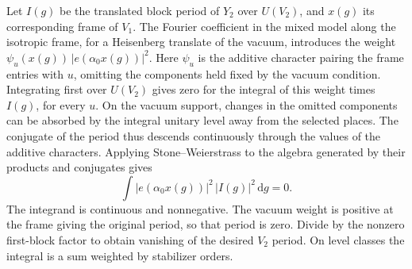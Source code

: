 Let \(I(g)\) be the translated block period of \(Y_2\) over \(U(V_2)\),
and \(x(g)\) its corresponding frame of \(V_1\). The Fourier coefficient
in the mixed model along the isotropic frame, for a Heisenberg translate
of the vacuum, introduces the weight
\(\psi_u(x(g))\,|e(\alpha_0x(g))|^2\).
Here \(\psi_u\) is the additive character pairing the frame entries
with \(u\), omitting the components held fixed by the vacuum condition.
Integrating first over \(U(V_2)\) gives zero for the integral of this weight
times \(I(g)\), for every \(u\). On the vacuum support, changes in the
omitted components can be absorbed by the integral unitary level away
from the selected places. The conjugate of the period thus descends
continuously through the values of the additive characters. Applying
Stone--Weierstrass to the algebra generated by their products and
conjugates gives
\[
 \int |e(\alpha_0x(g))|^2\,|I(g)|^2\,\mathrm dg=0 .
\]
The integrand is continuous and nonnegative. The vacuum weight is positive
at the frame giving the original period, so that period is zero. Divide
by the nonzero first-block factor to obtain vanishing of the desired
\(V_2\) period. On level classes the integral is a sum weighted by
stabilizer orders.
